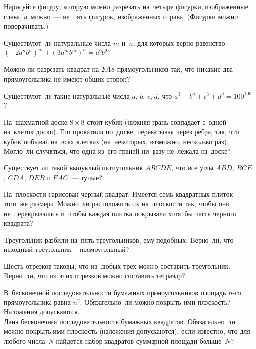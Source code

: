 \resetproblem \begingroup %
    \def\jeolmdate{24 октября 2018 г.}%
\jeolmheader \endgroup


\begin{problems}

\item
Нарисуйте фигуру, которую можно разрезать на~четыре фигурки, изображенные
слева, а~можно~--- на~пять фигурок, изображенных справа.
(Фигурки можно поворачивать.)
\begin{center}
\qquad
\end{center}

\item
Существуют~ли натуральные числа $m$ и~$n$, для которых верно равенство:
$(-2 a^n b^n)^m + (3 a^m b^m)^n = a^6 b^6$?

\item Можно ли разрезать квадрат на $2018$ прямоугольников так, что никакие два прямоугольника не имеют общих сторон? 

\item
Существуют~ли такие натуральные числа $a$, $b$, $c$, $d$, что
$a^3 + b^3 + c^3 + d^3 = 100^{100}$?

\item
На~шахматной доске $8 \times 8$ стоит кубик
(нижняя грань совпадает с~одной из~клеток доски).
Его прокатили по~доске, перекатывая через ребра, так, что кубик побывал на~всех
клетках (на~некоторых, возможно, несколько раз).
Могло~ли случиться, что одна из~его граней ни~разу не~лежала на~доске?

\item Существует ли такой выпуклый пятиугольник $ABCDE$, что все углы $ABD$, $BCE$, $CDA$, $DEB$ и $EAC$~--- тупые?

\item
На~плоскости нарисован черный квадрат.
Имеется семь квадратных плиток того~же размера.
Можно~ли расположить их на~плоскости так, чтобы они не~перекрывались и~чтобы
каждая плитка покрывала хотя~бы часть черного квадрата?

\item
Tреугольник разбили на~пять треугольников, ему подобных.
Bерно~ли, что исходный треугольник -- прямоугольный?

\item
Шесть отрезков таковы, что из~любых трех можно составить треугольник.
Bерно~ли, что из~этих отрезков можно составить тетраэдр?

\item
\subproblem
В~бесконечной последовательности бумажных прямоугольников площадь $n$-го
прямоугольника равна $n^2$.
Обязательно~ли можно покрыть ими плоскость?
Наложения допускаются.
\\
\subproblem
Дана бесконечная последовательность бумажных квадратов.
Обязательно~ли можно покрыть ими плоскость (наложения допускаются), если
известно, что для любого числа~$N$ найдется набор квадратов суммарной площади
больше~$N$?

\end{problems}


